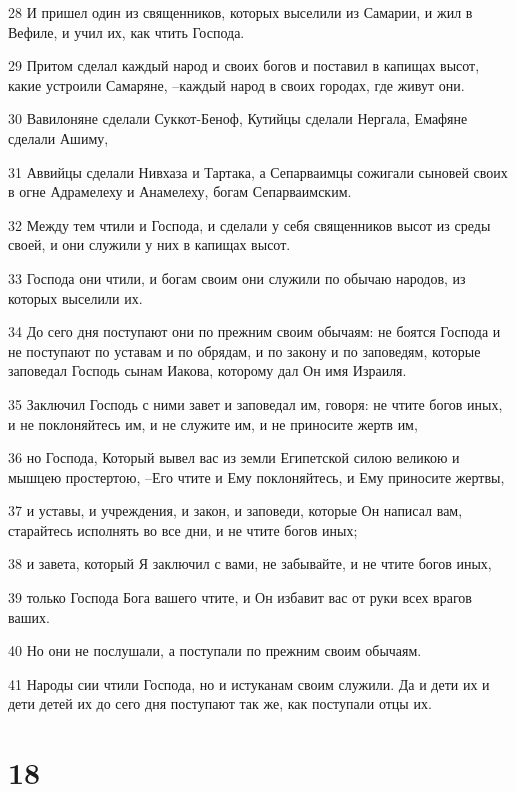 \par 28 И пришел один из священников, которых выселили из Самарии, и жил в Вефиле, и учил их, как чтить Господа.
\par 29 Притом сделал каждый народ и своих богов и поставил в капищах высот, какие устроили Самаряне, --каждый народ в своих городах, где живут они.
\par 30 Вавилоняне сделали Суккот-Беноф, Кутийцы сделали Нергала, Емафяне сделали Ашиму,
\par 31 Аввийцы сделали Нивхаза и Тартака, а Сепарваимцы сожигали сыновей своих в огне Адрамелеху и Анамелеху, богам Сепарваимским.
\par 32 Между тем чтили и Господа, и сделали у себя священников высот из среды своей, и они служили у них в капищах высот.
\par 33 Господа они чтили, и богам своим они служили по обычаю народов, из которых выселили их.
\par 34 До сего дня поступают они по прежним своим обычаям: не боятся Господа и не поступают по уставам и по обрядам, и по закону и по заповедям, которые заповедал Господь сынам Иакова, которому дал Он имя Израиля.
\par 35 Заключил Господь с ними завет и заповедал им, говоря: не чтите богов иных, и не поклоняйтесь им, и не служите им, и не приносите жертв им,
\par 36 но Господа, Который вывел вас из земли Египетской силою великою и мышцею простертою, --Его чтите и Ему поклоняйтесь, и Ему приносите жертвы,
\par 37 и уставы, и учреждения, и закон, и заповеди, которые Он написал вам, старайтесь исполнять во все дни, и не чтите богов иных;
\par 38 и завета, который Я заключил с вами, не забывайте, и не чтите богов иных,
\par 39 только Господа Бога вашего чтите, и Он избавит вас от руки всех врагов ваших.
\par 40 Но они не послушали, а поступали по прежним своим обычаям.
\par 41 Народы сии чтили Господа, но и истуканам своим служили. Да и дети их и дети детей их до сего дня поступают так же, как поступали отцы их.

\chapter{18}

